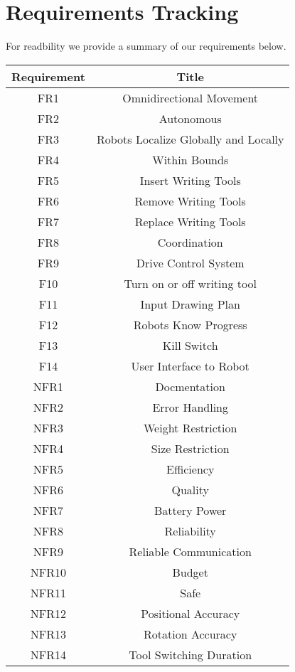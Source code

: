 \section{Requirements Tracking}
\label{sec:requirements_tracking}

For readbility we provide a summary of our requirements below. 

\begin{center}
 \begin{tabular}{||c c ||}
 \hline
 Requirement & Title \\ [0.5ex]
 \hline\hline
 FR1 & Omnidirectional Movement  \\
 \hline
 FR2 & Autonomous \\
 \hline
 FR3 & Robots Localize Globally and Locally \\
 \hline
 FR4 & Within Bounds \\
 \hline
 FR5 & Insert Writing Tools \\
 \hline
 FR6 & Remove Writing Tools \\
 \hline
 FR7 & Replace Writing Tools \\
 \hline
 FR8 & Coordination \\
 \hline
 FR9 & Drive Control System \\
 \hline
 F10 & Turn on or off writing tool \\
 \hline
 F11 & Input Drawing Plan \\
 \hline
 F12 & Robots Know Progress \\
 \hline
 F13 & Kill Switch \\
 \hline
 F14 & User Interface to Robot \\
 \hline
 NFR1 & Docmentation \\
 \hline
 NFR2 & Error Handling \\
 \hline
 NFR3 & Weight Restriction \\
 \hline
 NFR4 & Size Restriction \\
 \hline
 NFR5 & Efficiency \\
 \hline
 NFR6 & Quality \\
 \hline
 NFR7 & Battery Power \\
 \hline 
 NFR8 & Reliability \\
 \hline 
 NFR9 & Reliable Communication \\
 \hline 
 NFR10 & Budget \\
 \hline 
 NFR11 & Safe \\
 \hline
 NFR12 & Positional Accuracy \\
 \hline
 NFR13 & Rotation Accuracy \\
 \hline
 NFR14 & Tool Switching Duration \\
\hline
\end{tabular}
\end{center}

